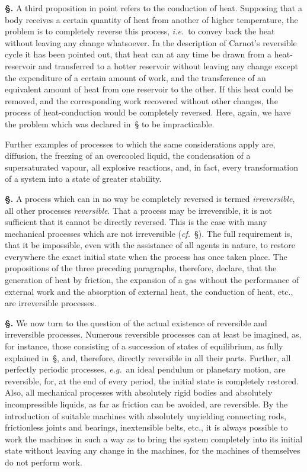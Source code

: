 \documentclass[12pt]{book}[2005/09/16]
\newcommand{\Section}[1]{
  \medskip\par\textbf{§\;#1}
  \label{section:#1}
}
\newcommand{\SecRef}[2][§\;]{\hyperref[section:#2.]{{\upshape #1#2}}}
\newcommand{\PageSep}[1]{\ignorespaces}
\newcommand{\eg}{\emph{e.g.}}
\newcommand{\ie}{\emph{i.e.}}
\renewcommand{\cf}{\emph{cf.}}
\begin{document}
\Section{111.} A third proposition in point refers to the conduction
of heat. Supposing that a body receives a certain
quantity of heat from another of higher temperature, the
problem is to completely reverse this process, \ie\ to convey
back the heat without leaving any change whatsoever. In
the description of Carnot's reversible cycle it has been
pointed out, that heat can at any time be drawn from a
heat-reservoir and transferred to a hotter reservoir without
leaving any change except the expenditure of a certain
amount of work, and the transference of an equivalent
amount of heat from one reservoir to the other. If this
heat could be removed, and the corresponding work recovered
without other changes, the process of heat-conduction
would be completely reversed. Here, again, we have
the problem which was declared in~\SecRef{109} to be impracticable.

Further examples of processes to which the same considerations
%
apply are, diffusion, the freezing of an overcooled
liquid, the condensation of a supersaturated vapour, all
explosive reactions, and, in fact, every transformation of a
system into a state of greater stability.

\Section{112.} A process which can in no way be completely
reversed is termed \emph{irreversible}, all other processes \emph{reversible}.
That a process may be irreversible, it is not
sufficient that it cannot be directly reversed. This is the
\PageSep{83}
case with many mechanical processes which are not irreversible
%
(\cf~\SecRef{113}). The full requirement is, that it be
impossible, even with the assistance of all agents in nature,
to restore everywhere the exact initial state when the
process has once taken place. The propositions of the three
preceding paragraphs, therefore, declare, that the generation
of heat by friction, the expansion of a gas without the performance
of external work and the absorption of external
heat, the conduction of heat, etc., are irreversible processes.

\Section{113.} We now turn to the question of the actual
existence of reversible and irreversible processes. Numerous
reversible processes can at least be imagined, as, for instance,
those consisting of a succession of states of equilibrium, as
fully explained in~\SecRef{71}, and, therefore, directly reversible in
all their parts. Further, all perfectly periodic processes,
\eg\ an ideal pendulum or planetary motion, are reversible,
for, at the end of every period, the initial state is completely
restored. Also, all mechanical processes with absolutely
rigid bodies and absolutely incompressible liquids, as far as
friction can be avoided, are reversible. By the introduction
of suitable machines with absolutely unyielding connecting
rods, frictionless joints and bearings, inextensible belts, etc.,
it is always possible to work the machines in such a way as
to bring the system completely into its initial state without
leaving any change in the machines, for the machines of
themselves do not perform work.
\end{document}
